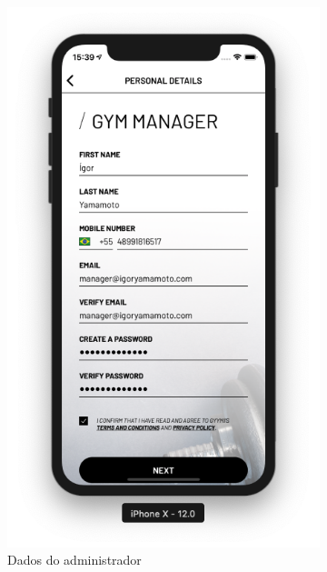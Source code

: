 \begin{figure}[h]
	\centering
    \begin{subfigure}[b]{0.4\textwidth}
        \includegraphics[width=\textwidth]{pfc/figuras/register-manager.png}
        \caption{Dados do administrador}
        \label{fig:register-manager-data}
    \end{subfigure}
    ~
	\begin{subfigure}[b]{0.4\textwidth}

\end{subfigure}
\end{figure}
